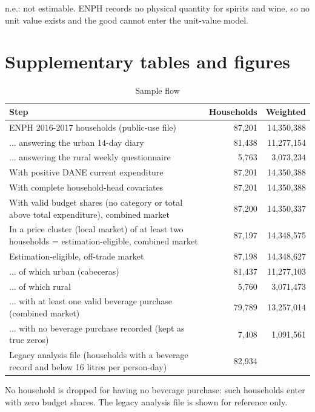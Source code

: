 \documentclass[
  11pt,
]{article}
\begin{document}
\begin{table}[!htbp]
\begin{threeparttable}
\begin{tablenotes}[flushleft]
\item n.e.: not estimable. ENPH records no physical quantity for spirits and wine, so no unit value exists and the good cannot enter the unit-value model.
\end{tablenotes}
\end{threeparttable}
\end{table}

\clearpage

\section{Supplementary tables and
figures}\label{supplementary-tables-and-figures}

\begin{table}[!htbp]
\centering
\begin{threeparttable}
\caption{Sample flow}
\label{tab:sampleflow}
\footnotesize
\begin{tabular}{p{10.5cm}rr}
\toprule
Step & Households & Weighted \\
\midrule
ENPH 2016-2017 households (public-use file) & 87,201 & 14,350,388 \\
... answering the urban 14-day diary & 81,438 & 11,277,154 \\
... answering the rural weekly questionnaire & 5,763 & 3,073,234 \\
With positive DANE current expenditure & 87,201 & 14,350,388 \\
With complete household-head covariates & 87,201 & 14,350,388 \\
With valid budget shares (no category or total above total expenditure), combined market & 87,200 & 14,350,337 \\
In a price cluster (local market) of at least two households = estimation-eligible, combined market & 87,197 & 14,348,575 \\
Estimation-eligible, off-trade market & 87,198 & 14,348,627 \\
... of which urban (cabeceras) & 81,437 & 11,277,103 \\
... of which rural & 5,760 & 3,071,473 \\
... with at least one valid beverage purchase (combined market) & 79,789 & 13,257,014 \\
... with no beverage purchase recorded (kept as true zeros) & 7,408 & 1,091,561 \\
Legacy analysis file (households with a beverage record and below 16 litres per person-day) & 82,934 &  \\
\bottomrule
\end{tabular}
\begin{tablenotes}[flushleft]
\footnotesize
\item No household is dropped for having no beverage purchase: such households enter with zero budget shares. The legacy analysis file is shown for reference only.
\end{tablenotes}
\end{threeparttable}
\end{table}
\end{document}
